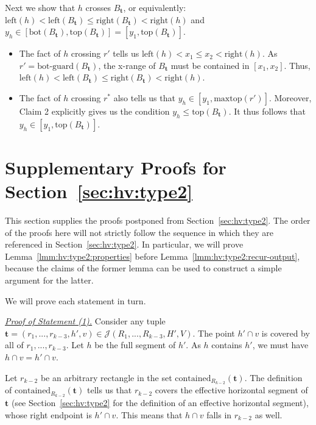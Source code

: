\documentclass[acmsmall,review,anonymous]{acmart}
\def\vgap{\vspace{1mm}}
\def\extraspacing{\vspace{2mm} \noindent}
\def\J{\mathcal{J}}
\def\xleft{\mathrm{left}}
\def\xright{\mathrm{right}}
\def\ybot{\mathrm{bot}}
\def\ytop{\mathrm{top}}
\def\maxtop{\mathrm{maxtop}}
\def\gbot{\mathrm{bot\text{-}guard}}
\def\contained{\mathrm{contained}}
\begin{document}
{{{{\vgap

\item Next we show that $h$ crosses $B_{\bm{t}}$, or equivalently: $\xleft(h) < \xleft(B_{\bm{t}}) \le \xright(B_{\bm{t}}) < \xright(h)$ and $y_h \in [\ybot(B_\bm{t}), \ytop(B_{\bm{t}})] = [y_1, \ytop(B_{\bm{t}})]$.
    
    \vgap

\begin{itemize}
    \item The fact of $h$ crossing $r'$ tells us $\xleft(h) < x_1 \leq x_2 < \xright(h)$. As $r' = \gbot(B_{\bm{t}})$, the x-range of $B_{\bm{t}}$ must be contained in $[x_1,x_2]$. Thus, $\xleft(h) < \xleft(B_{\bm{t}}) \le \xright(B_{\bm{t}}) < \xright(h)$.

    \vgap

    \item The fact of $h$ crossing $r^*$ also tells us that $y_h \in [y_1, \maxtop(r')]$. Moreover, Claim 2 explicitly gives us the condition $y_h \leq \ytop(B_{\bm{t}})$. It thus follows that $y_h \in [y_1, \ytop(B_{\bm{t}})]$.
\end{itemize}
}

\section{Supplementary Proofs for Section~\ref{sec:hv:type2}} \label{app:hv:type2}

This section supplies the proofs postponed from Section~\ref{sec:hv:type2}. The order of the proofs here will not strictly follow the sequence in which they are referenced in Section~\ref{sec:hv:type2}. In particular, we will prove Lemma~\ref{lmm:hv:type2:properties} before Lemma~\ref{lmm:hv:type2:recur-output}, because the claims of the former lemma can be used to construct a simple argument for the latter.

\extraspacing {\bf Proof of Lemma~\ref{lmm:hv:type2:properties}.} We will prove each statement in turn.

\extraspacing \underline{\em Proof of Statement (1).} Consider any tuple $\bm{t} = (r_1,...,r_{k-3}, h', v) \in \J(R_1,...,R_{k-3},H',V)$. The point $h' \cap v$ is covered by all of $r_1,...,r_{k-3}$. Let $h$ be the full segment of $h'$. As $h$ contains $h'$, we must have $h \cap v = h' \cap v$.

\vgap

Let $r_{k-2}$ be an arbitrary rectangle in the set $\contained_{R_{k-2}}(\bm{t})$. The definition of $\contained_{R_{k-2}}(\bm{t})$ tells us that $r_{k-2}$ covers the effective horizontal segment of $\bm{t}$ (see Section~\ref{sec:hv:type2} for the definition of an effective horizontal segment), whose right endpoint is $h' \cap v$. This means that $h \cap v$ falls in $r_{k-2}$ as well.

}}}
\end{document}
